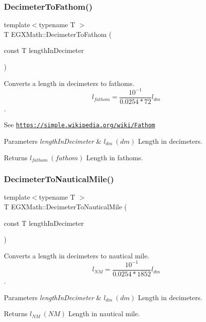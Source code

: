 \subsubsection{\texorpdfstring{Decimeter\+To\+Fathom()}{DecimeterToFathom()}}
{\footnotesize\ttfamily template$<$typename T $>$ \\
T E\+G\+X\+Math\+::\+Decimeter\+To\+Fathom (\begin{DoxyParamCaption}\item[{const T}]{length\+In\+Decimeter }\end{DoxyParamCaption})}



Converts a length in decimeters to fathoms. \[ l_{fathom}= \frac{10^{-1}}{0.0254 * 72} l_{dm} \]. 

See \href{https://simple.wikipedia.org/wiki/Fathom}{\tt https\+://simple.\+wikipedia.\+org/wiki/\+Fathom} 
\begin{DoxyParams}{Parameters}
{\em length\+In\+Decimeter} & $ l_{dm}\ (dm)$ Length in decimeters. \\
\hline
\end{DoxyParams}
\begin{DoxyReturn}{Returns}
$ l_{fathom}\ (fathom)$ Length in fathoms. 
\end{DoxyReturn}
\mbox{\label{group___e_g_x_math-_conversions-_length_conversions-_s_i-_decimeter-_nautical_ga6cc0e9987da30da6a30ddba50971ba2d}} 
\subsubsection{\texorpdfstring{Decimeter\+To\+Nautical\+Mile()}{DecimeterToNauticalMile()}}
{\footnotesize\ttfamily template$<$typename T $>$ \\
T E\+G\+X\+Math\+::\+Decimeter\+To\+Nautical\+Mile (\begin{DoxyParamCaption}\item[{const T}]{length\+In\+Decimeter }\end{DoxyParamCaption})}



Converts a length in decimeters to nautical mile. \[ l_{NM}= \frac{10^{-1}}{0.0254 * 1852} l_{dm} \]. 


\begin{DoxyParams}{Parameters}
{\em length\+In\+Decimeter} & $ l_{dm}\ (dm)$ Length in decimeters. \\
\hline
\end{DoxyParams}
\begin{DoxyReturn}{Returns}
$ l_{NM}\ (NM)$ Length in nautical mile. 
\end{DoxyReturn}
